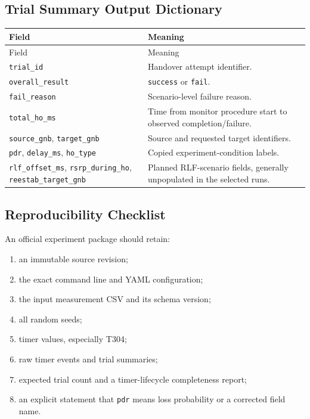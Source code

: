 \subsection{Trial Summary Output Dictionary}

\begin{longtable}{p{4.1cm}p{9.8cm}}
\toprule
Field & Meaning\\
\midrule
\endfirsthead
\toprule
Field & Meaning\\
\midrule
\endhead
\texttt{trial\_id} & Handover attempt identifier.\\
\texttt{overall\_result} & \texttt{success} or \texttt{fail}.\\
\texttt{fail\_reason} & Scenario-level failure reason.\\
\texttt{total\_ho\_ms} & Time from monitor procedure start to observed completion/failure.\\
\texttt{source\_gnb}, \texttt{target\_gnb} & Source and requested target identifiers.\\
\texttt{pdr}, \texttt{delay\_ms}, \texttt{ho\_type} & Copied experiment-condition labels.\\
\texttt{rlf\_offset\_ms}, \texttt{rsrp\_during\_ho}, \texttt{reestab\_target\_gnb} & Planned RLF-scenario fields, generally unpopulated in the selected runs.\\
\bottomrule
\end{longtable}

\subsection{Reproducibility Checklist}

An official experiment package should retain:

\begin{enumerate}
    \item an immutable source revision;
    \item the exact command line and YAML configuration;
    \item the input measurement CSV and its schema version;
    \item all random seeds;
    \item timer values, especially T304;
    \item raw timer events and trial summaries;
    \item expected trial count and a timer-lifecycle completeness report;
    \item an explicit statement that \texttt{pdr} means loss probability or a corrected field name.
\end{enumerate}

\clearpage
